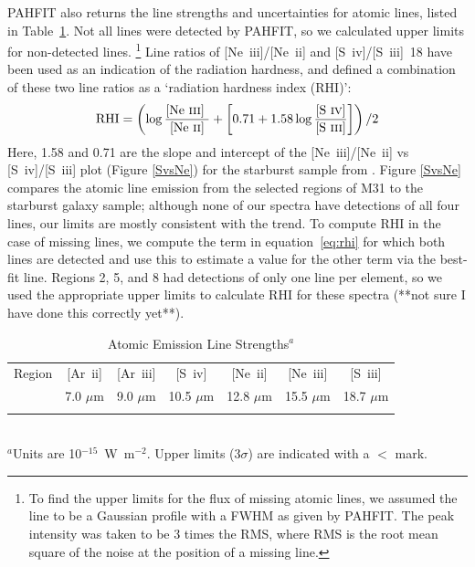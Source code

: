 PAHFIT also returns the line strengths and uncertainties for atomic lines, listed in Table~\ref{Atomic}.
Not all lines were detected by PAHFIT, so we calculated upper limits for non-detected lines.%
\footnote{To find  the upper limits for the flux of missing atomic lines, we assumed the line to be a 
Gaussian profile with a FWHM as given by PAHFIT. The peak intensity was taken to be 3 times the RMS, where RMS is the root mean square of 
the noise at the position of a missing line.}
Line ratios of [Ne~{\sc iii}]/[Ne~{\sc ii}] and [S~{\sc iv}]/[S~{\sc iii}]~18 have been used as an indication of the radiation hardness, and
\citet{Engelbracht_2008} defined a combination of these two line ratios as a `radiation hardness index (RHI)':
\begin{equation}
{\rm RHI} = \left( \log\frac{\textrm{[Ne~{\sc iii}] }}{\textrm{[Ne~{\sc ii}]}} + \left[0.71 + 1.58\log\frac{\textrm{{[S~{\sc iv}]}}}{\textrm{{[S~{\sc iii}]}}}\right]\right) /2
\end{equation}
\label{eq:rhi}
Here, 1.58 and 0.71 are the slope and intercept of the [Ne~{\sc iii}]/[Ne~{\sc ii}]  vs [S~{\sc iv}]/[S~{\sc iii}] plot (Figure \ref{SvsNe}) for the starburst sample from 
\citet{Engelbracht_2008}. 
Figure \ref{SvsNe}  compares the atomic line emission from the selected regions of M31 to the starburst galaxy sample;
although none of our spectra have detections of all four lines, our limits are mostly consistent with the trend.
To compute RHI in the case of missing lines, we compute the term in equation~\ref{eq:rhi} 
for which both lines are detected and use this to estimate a value for the other term via the best-fit line.
Regions 2, 5, and 8 had detections of only one line per element, so we used the appropriate upper limits 
to calculate RHI for these spectra (**not sure I have done this correctly yet**).


\begin{table}
 \centering
 \begin{minipage}{100mm}
\caption{Atomic Emission Line Strengths$^a$}
  \begin{tabular}{l c c  c  c  c  c  }
  \hline
  {Region  }&{[Ar~{\sc ii}] }&{[Ar~{\sc iii}]  }&{[S~{\sc iv}]}&{[Ne~{\sc ii}]   }&{[Ne~{\sc iii}]   }&{[S~{\sc iii}]  }\\
{}&{\tiny{7.0 $\mu$m} }&{\tiny{9.0 $\mu$m }}&{\tiny{10.5 $\mu$m}}&{\tiny{12.8 $\mu$m  }}&{\tiny{15.5 $\mu$m } }&{\tiny{18.7 $\mu$m }} \\
 \hline 
  
\hline
 \label{Atomic}
\end{tabular}\\
{ $^a$Units are 10$^{-15}$~W~m$^{-2}$. Upper limits ($3\sigma$) are indicated with a $<$ mark.  }
\end{minipage}
\end{table}

